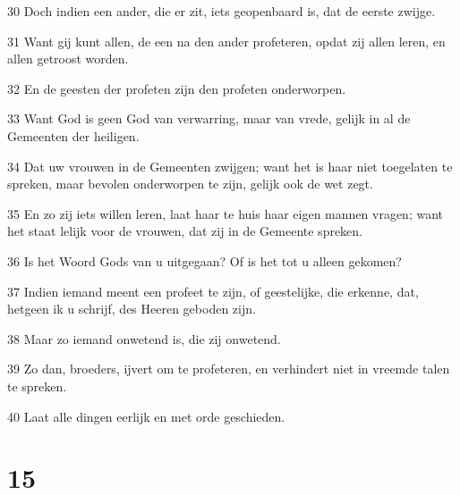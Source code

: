 \par 30 Doch indien een ander, die er zit, iets geopenbaard is, dat de eerste zwijge.
\par 31 Want gij kunt allen, de een na den ander profeteren, opdat zij allen leren, en allen getroost worden.
\par 32 En de geesten der profeten zijn den profeten onderworpen.
\par 33 Want God is geen God van verwarring, maar van vrede, gelijk in al de Gemeenten der heiligen.
\par 34 Dat uw vrouwen in de Gemeenten zwijgen; want het is haar niet toegelaten te spreken, maar bevolen onderworpen te zijn, gelijk ook de wet zegt.
\par 35 En zo zij iets willen leren, laat haar te huis haar eigen mannen vragen; want het staat lelijk voor de vrouwen, dat zij in de Gemeente spreken.
\par 36 Is het Woord Gods van u uitgegaan? Of is het tot u alleen gekomen?
\par 37 Indien iemand meent een profeet te zijn, of geestelijke, die erkenne, dat, hetgeen ik u schrijf, des Heeren geboden zijn.
\par 38 Maar zo iemand onwetend is, die zij onwetend.
\par 39 Zo dan, broeders, ijvert om te profeteren, en verhindert niet in vreemde talen te spreken.
\par 40 Laat alle dingen eerlijk en met orde geschieden.

\chapter{15}

